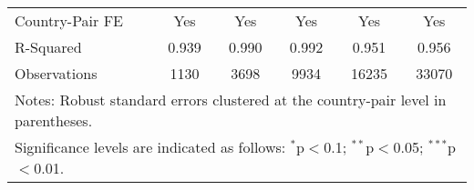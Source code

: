 \begin{table}[htbp]
\begin{adjustbox}{max width=\textwidth}
\begin{tabular}{lccccc}
    Country-Pair FE & Yes & Yes & Yes & Yes & Yes \\
    R-Squared & 0.939 & 0.990 & 0.992 & 0.951 & 0.956 \\
    Observations & 1130 & 3698 & 9934 & 16235 & 33070 \\
    \hline
    \multicolumn{6}{l}{\footnotesize{Notes: Robust standard errors clustered at the country-pair level in parentheses.}} \\
    \multicolumn{6}{l}{\footnotesize{Significance levels are indicated as follows: $^{\ast}$p$<$0.1; $^{\ast\ast}$p$<$0.05; $^{\ast\ast\ast}$p$<$0.01.}} \\
    \end{tabular}
    \end{adjustbox}
\end{table}
